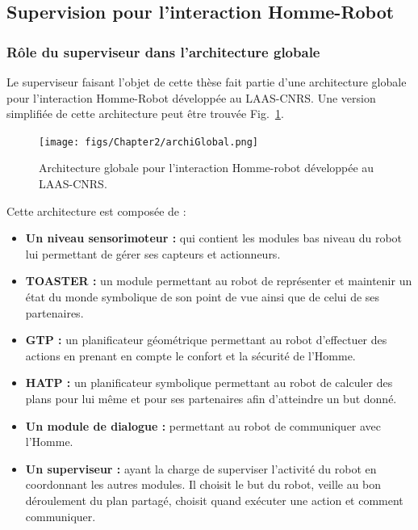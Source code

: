 \documentclass[english,a4paper,11pt,twoside]{StyleThese}
\begin{document}
\newpage
\subsection{Supervision pour l'interaction Homme-Robot}


\subsubsection{Rôle du superviseur dans l'architecture globale}

Le superviseur faisant l'objet de cette thèse fait partie d'une architecture globale pour l'interaction Homme-Robot développée au LAAS-CNRS. Une version simplifiée de cette architecture peut être trouvée Fig.~\ref{fig:GlobalArchi}. 


\begin{figure}[!h]
	\centering
    \texttt{[image: figs/Chapter2/archiGlobal.png]}
    \caption{Architecture globale pour l'interaction Homme-robot développée au LAAS-CNRS.}
    \label{fig:GlobalArchi}
\end{figure}

Cette architecture est composée de :
\begin{itemize}
\item \textbf{Un niveau sensorimoteur :} qui contient les modules bas niveau du robot lui permettant de gérer ses capteurs et actionneurs.
\item \textbf{TOASTER :} un module permettant au robot de représenter et maintenir un état du monde symbolique de son point de vue ainsi que de celui de ses partenaires.
\item \textbf{GTP :} un planificateur géométrique permettant au robot d'effectuer des actions en prenant en compte le confort et la sécurité de 
l'Homme.
\item \textbf{HATP :} un planificateur symbolique permettant au robot de calculer des plans pour lui même et pour ses partenaires afin d'atteindre un but donné.
\item \textbf{Un module de dialogue :} permettant au robot de communiquer avec l'Homme.
\item \textbf{Un superviseur :} ayant la charge de superviser l'activité du robot en coordonnant les autres modules. Il choisit le but du robot, veille au bon déroulement du plan partagé, choisit quand exécuter une action et comment communiquer.
\end{itemize}
\end{document}
